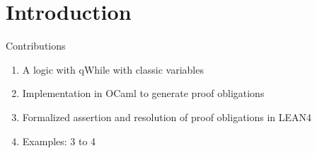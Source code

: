 
\section{Introduction}
Contributions
\begin{enumerate}
    \item A logic with qWhile with classic variables
    \item Implementation in OCaml to generate proof obligations
    \item Formalized assertion and resolution of proof obligations in LEAN4
    \item Examples: 3 to 4
\end{enumerate}